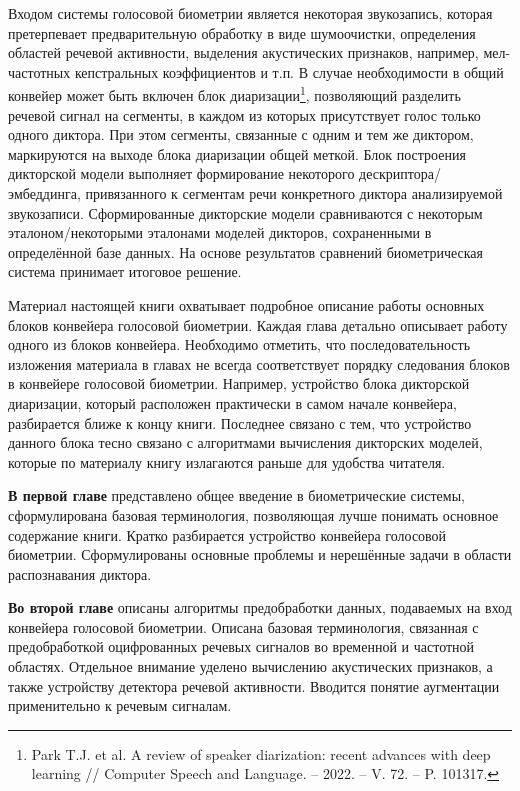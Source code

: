 \documentclass[12pt]{book}
\begin{document}
\large{Входом системы голосовой биометрии является некоторая звукозапись, которая претерпевает предварительную обработку в виде шумоочистки, определения областей речевой активности, выделения акустических признаков, например, мел-частотных кепстральных коэффициентов и т.п. В случае необходимости в общий конвейер может быть включен блок диаризации\footnote{Park T.J. et al. A review of speaker diarization: recent advances with deep learning // Computer Speech and Language. -- 2022. -- V. 72. – P. 101317.}, позволяющий разделить речевой сигнал на сегменты, в каждом из которых присутствует голос только одного диктора. При этом сегменты, связанные с одним и тем же диктором, маркируются на выходе блока диаризации общей меткой. Блок построения дикторской модели выполняет формирование некоторого дескриптора/эмбеддинга, привязанного к сегментам речи конкретного диктора анализируемой звукозаписи. Сформированные дикторские модели сравниваются с некоторым эталоном/некоторыми эталонами моделей дикторов, сохраненными в определённой базе данных. На основе результатов сравнений биометрическая система принимает итоговое решение.}

Материал настоящей книги охватывает подробное описание работы основных блоков конвейера голосовой биометрии. Каждая глава детально описывает работу одного из блоков конвейера. Необходимо отметить, что последовательность изложения материала в главах не всегда соответствует порядку следования блоков в конвейере голосовой биометрии. Например, устройство блока дикторской диаризации, который расположен практически в самом начале конвейера, разбирается ближе к концу книги. Последнее связано с тем, что устройство данного блока тесно связано с алгоритмами вычисления дикторских моделей, которые по материалу книгу излагаются раньше для удобства читателя.

\textbf{В первой главе} представлено общее введение в биометрические системы, сформулирована базовая терминология, позволяющая лучше понимать основное содержание книги. Кратко разбирается устройство конвейера голосовой биометрии. Сформулированы основные проблемы и нерешённые задачи в области распознавания диктора.

\textbf{Во второй главе} описаны алгоритмы предобработки данных, подаваемых на вход конвейера голосовой биометрии. Описана базовая терминология, связанная с предобработкой оцифрованных речевых сигналов во временной и частотной областях. Отдельное внимание уделено вычислению акустических признаков, а также устройству детектора речевой активности. Вводится понятие аугментации применительно к речевым сигналам.
\end{document}
